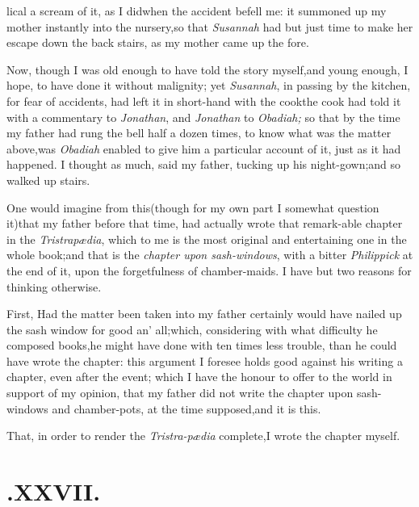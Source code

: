 \documentclass{article}
\begin{document}
\eject\noindent\enlargethispage\baselineskip
lical a scream of it, as I did\tsk when the accident
befell me: it summoned up my mother instantly into the nursery,\tsk so
that \textit{Susannah} had but just time to make her escape down the
back stairs, as my mother came up the fore.

Now, though I was old enough to have told the story
myself,\tsk and young\break
enough, I hope, to have done it without\break
malignity; yet \textit{Susannah}, in passing by the kitchen, for fear
of accidents, had left it in short-hand with the cook\tsk the
cook had told it with a commentary to \textit{Jonathan}, and
\textit{Jonathan} to \textit{Obadiah;} so that by the time my father
had rung the bell half a dozen times, to know what was the matter
above,\tsk was \textit{Obadiah} enabled to give him a
particular account of it, just as it had happened.\tsk\break
I thought as much, said my father, tucking up his
night-gown;\tsk and so walked up stairs.

One would imagine from this\tsh (though for my own part I somewhat
question it)\tsk that my father before that time, had actually wrote
that remark-\break able chapter in the \textit{Tristrapædia}, which to me is
the most original and entertaining one in the whole book;\tsk and that
is\break
the \textit{chapter upon sash-windows}, with a bitter
\textit{Philippick} at the end of it, upon the forgetfulness of
chamber-maids.\tsk\break
I have but two reasons for thinking otherwise.

First, Had the matter been taken into
my father certainly would have nailed up the sash
window for good an’ all;\tsk which, considering with what
difficulty he composed books,\tsk he might have done with ten
times less trouble, than he could have wrote the chapter: this
argument I foresee holds good against his writing a chapter, even
after the event;
which I have the honour to offer to the world in support of my
opinion, that my father did not write the chapter upon sash-windows
and chamber-pots, at the time supposed,\tsk and it is this.


\tsh  That, in order to render the
\textit{Tristra-pædia} complete,\tsk I wrote the chapter
myself.

\section{.\enspace  XXVII.}
\end{document}
